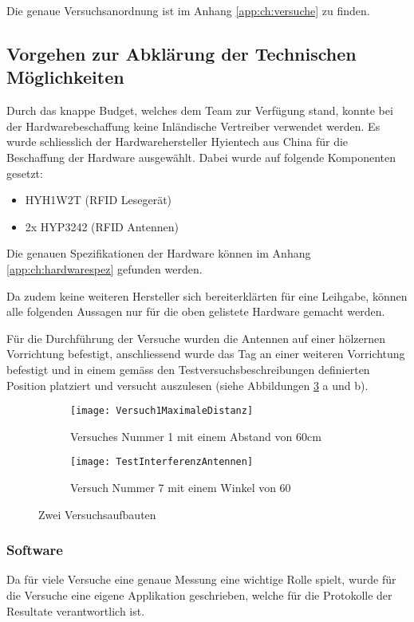 Die genaue Versuchsanordnung ist im Anhang \ref{app:ch:versuche} zu finden.

\subsection{Vorgehen zur Abklärung der Technischen Möglichkeiten}

Durch das knappe Budget, welches dem Team zur Verfügung stand, konnte bei der Hardwarebeschaffung keine Inländische Vertreiber verwendet werden. Es wurde schliesslich der Hardwarehersteller Hyientech aus China für die Beschaffung der Hardware ausgewählt. Dabei wurde auf folgende Komponenten gesetzt:

\begin{itemize}
	\item HYH1W2T (RFID Lesegerät)
	\item 2x HYP3242 (RFID Antennen)
\end{itemize}

Die genauen Spezifikationen der Hardware können im Anhang \ref{app:ch:hardwarespez} gefunden werden.

Da zudem keine weiteren Hersteller sich bereiterklärten für eine Leihgabe, können alle folgenden Aussagen nur für die oben gelistete Hardware gemacht werden.

Für die Durchführung der Versuche wurden die Antennen auf einer hölzernen Vorrichtung befestigt, anschliessend wurde das Tag an einer weiteren Vorrichtung befestigt und in einem gemäss den Testversuchsbeschreibungen definierten Position platziert und versucht auszulesen (siehe Abbildungen \ref{fig:versuchsaufbauten} a und b).
\begin{figure}[h!]
	\begin{subfigure}{.5\linewidth}
		\texttt{[image: Versuch1MaximaleDistanz]}
		\caption{Versuches Nummer 1 mit einem Abstand von 60cm}
		\label{fig:versuchaufbaunmr1}
	\end{subfigure}\hfill%
	\begin{subfigure}{.35\linewidth}
		\centering
		\texttt{[image: TestInterferenzAntennen]}
		\caption{Versuch Nummer 7 mit einem Winkel von 60\SIUnitSymbolDegree}
		\label{fig:versuchaufbaunmr7}
	\end{subfigure}
	\caption{Zwei Versuchsaufbauten}
	\label{fig:versuchsaufbauten}
\end{figure}


\subsubsection{Software}
Da für viele Versuche eine genaue Messung eine wichtige Rolle spielt, wurde für die Versuche eine eigene Applikation geschrieben, welche für die Protokolle der Resultate verantwortlich ist.


